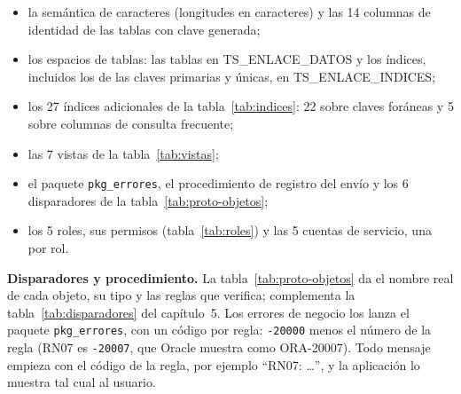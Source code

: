 \begin{itemize}[itemsep=2pt]
  \item la semántica de caracteres (longitudes en caracteres) y las
        14 columnas de identidad de las tablas con clave generada;
  \item los espacios de tablas: las tablas en TS\_ENLACE\_DATOS y los
        índices, incluidos los de las claves primarias y únicas, en
        TS\_ENLACE\_INDICES;
  \item los 27 índices adicionales de la tabla~\ref{tab:indices}: 22
        sobre claves foráneas y 5 sobre columnas de consulta frecuente;
  \item las 7 vistas de la tabla~\ref{tab:vistas};
  \item el paquete \texttt{pkg\_errores}, el procedimiento de registro del
        envío y los 6 disparadores de la tabla~\ref{tab:proto-objetos};
  \item los 5 roles, sus permisos (tabla~\ref{tab:roles}) y las 5 cuentas
        de servicio, una por rol.
\end{itemize}

\textbf{Disparadores y procedimiento.} La tabla~\ref{tab:proto-objetos}
da el nombre real de cada objeto, su tipo y las reglas que verifica;
complementa la tabla~\ref{tab:disparadores} del capítulo~5. Los errores
de negocio los lanza el paquete \texttt{pkg\_errores}, con un código por
regla: \texttt{-20000} menos el número de la regla (RN07 es
\texttt{-20007}, que Oracle muestra como ORA-20007). Todo mensaje empieza
con el código de la regla, por ejemplo ``RN07: \ldots'', y la aplicación
lo muestra tal cual al usuario.


